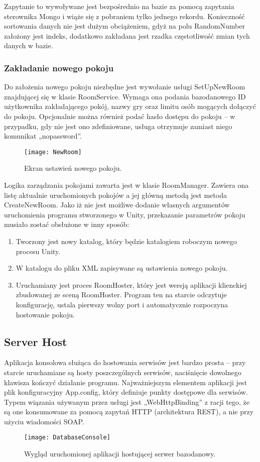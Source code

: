 Zapytanie to wywoływane jest bezpośrednio na bazie za pomocą zapytania sterownika Mongo i wiąże się z pobraniem tylko jednego rekordu. Konieczność sortowania danych nie jest dużym obciążeniem, gdyż na polu RandomNumber założony jest indeks, dodatkowo zakładana jest rzadka częstotliwość zmian tych danych w bazie.

\subsubsection{Zakładanie nowego pokoju}
Do założenia nowego pokoju niezbędne jest wywołanie usługi SetUpNewRoom znajdującej się w klasie RoomService. Wymaga ona podania bazodanowego ID użytkownika zakładającego pokój, nazwy gry oraz limitu osób mogących dołączyć do pokoju. Opcjonalnie można również podać hasło dostępu do pokoju – w przypadku, gdy nie jest ono zdefiniowane, usługa otrzymuje zamiast niego komunikat „nopassword”.

\begin{figure}[htbp]
\centering
\texttt{[image: NewRoom]}
\caption{Ekran ustawień nowego pokoju.}
\label{fig:newroom}
\end{figure}

Logika zarządzania pokojami zawarta jest w klasie RoomManager. Zawiera ona listę aktualnie uruchomionych pokojów a jej główną metodą jest metoda CreateNewRoom. Jako iż nie jest możliwe dodanie własnych argumentów uruchomienia programu stworzonego w Unity, przekazanie parametrów pokoju musiało zostać obsłużone w inny sposób:
\begin{enumerate}
\item Tworzony jest nowy katalog, który będzie katalogiem roboczym nowego procesu Unity.
\item W katalogu do pliku XML zapisywane są ustawienia nowego pokoju.
\item Uruchamiany jest proces RoomHoster, który jest wersją aplikacji klienckiej zbudowanej ze sceną RoomHoster. Program ten na starcie odczytuje konfigurację, ustala pierwszy wolny port i automatycznie rozpoczyna hostowanie pokoju.
\end{enumerate}

\subsection{Server Host}
Aplikacja konsolowa służąca do hostowania serwisów jest bardzo prosta – przy starcie uruchamiane są hosty poszczególnych serwisów, naciśnięcie dowolnego klawisza kończyć działanie programu. Najważniejszym elementem aplikacji jest plik konfiguracyjny App.config, który definiuje punkty dostępowe dla serwisów. Typem wiązania używanym przez usługi jest „WebHttpBinding” z racji tego, że są one konsumowane za pomocą zapytań HTTP (architektura REST), a nie przy użyciu wiadomości SOAP.

\begin{figure}[htbp]
\centering
\texttt{[image: DatabaseConsole]}
\caption{Wygląd uruchomionej aplikacji hostującej serwer bazodanowy.}
\label{fig:databaseconsole}
\end{figure}